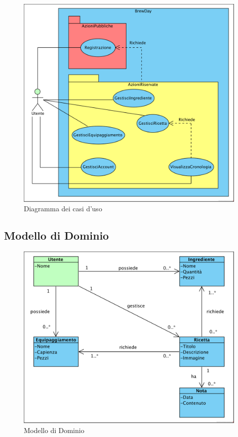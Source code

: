 \documentclass[12pt]{article}
\begin{document}
\begin{figure}[H]
\centering
\includegraphics[width=440px]{diagramma_casi_d_uso.png}
\caption{\label{fig:diagramma_casi_d_uso}Diagramma dei casi d'uso}
\end{figure}


\subsection{Modello di Dominio}

\begin{figure}[H]
\centering
\includegraphics[width=440px]{modello_dominio.png}
\caption{\label{fig:modello_dominio}Modello di Dominio}
\end{figure}
\end{document}
